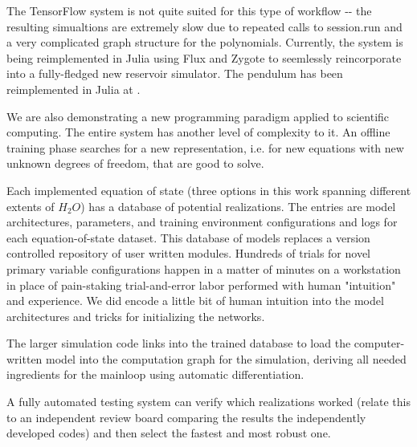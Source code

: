 \documentclass[]{article}
\begin{document}
The TensorFlow system is not quite suited for this type of workflow -\/-
the resulting simualtions are extremely slow due to repeated calls to
session.run and a very complicated graph structure for the polynomials.
Currently, the system is being reimplemented in Julia using Flux and
Zygote to seemlessly reincorporate into a fully-fledged new reservoir
simulator. The pendulum has been reimplemented in Julia at .

We are also demonstrating a new programming paradigm applied to
scientific computing. The entire system has another level of complexity
to it. An offline training phase searches for a new representation, i.e.
for new equations with new unknown degrees of freedom, that are good to
solve.

Each implemented equation of state (three options in this work spanning
different extents of \(H_2O\)) has a database of potential realizations.
The entries are model architectures, parameters, and training
environment configurations and logs for each equation-of-state dataset.
This database of models replaces a version controlled repository of user
written modules. Hundreds of trials for novel primary variable
configurations happen in a matter of minutes on a workstation in place
of pain-staking trial-and-error labor performed with human "intuition"
and experience. We did encode a little bit of human intuition into the
model architectures and tricks for initializing the networks.

The larger simulation code links into the trained database to load the
computer-written model into the computation graph for the simulation,
deriving all needed ingredients for the mainloop using automatic
differentiation.

A fully automated testing system can verify which realizations worked
(relate this to an independent review board comparing the results the
independently developed codes) and then select the fastest and most
robust one.
\end{document}
